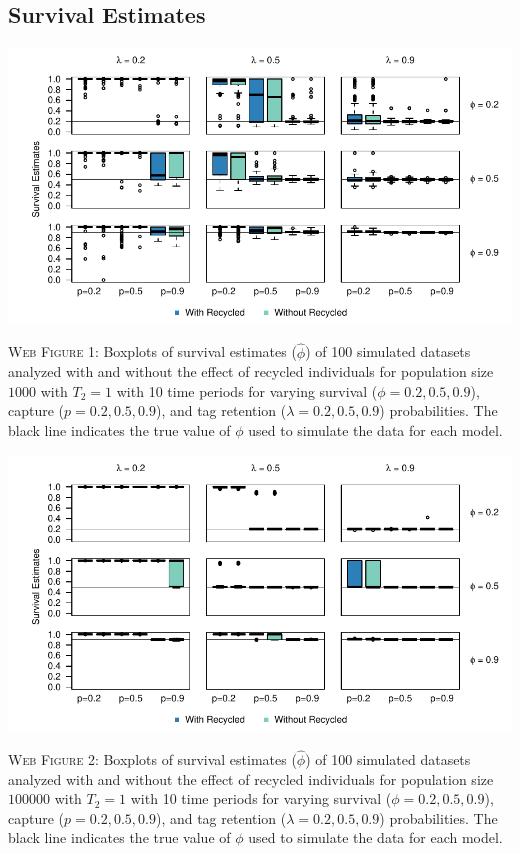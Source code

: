 \documentclass[]{article}
\begin{document}
\clearpage

\subsection{Survival Estimates}\label{survival-estimates}

\includegraphics{Appendix_files/figure-latex/1_survival_GJSTL1-1.pdf}

\textsc{Web Figure 1:} Boxplots of survival estimates (\(\hat{\phi}\))
of 100 simulated datasets analyzed with and without the effect of
recycled individuals for population size \(1000\) with \(T_2=1\) with 10
time periods for varying survival (\(\phi=0.2,0.5,0.9\)), capture
(\(p=0.2,0.5,0.9\)), and tag retention (\(\lambda=0.2,0.5,0.9\))
probabilities. The black line indicates the true value of \(\phi\) used
to simulate the data for each model.

\includegraphics{Appendix_files/figure-latex/2_survival_GJSTL2-1.pdf}

\textsc{Web Figure 2:} Boxplots of survival estimates (\(\hat{\phi}\))
of 100 simulated datasets analyzed with and without the effect of
recycled individuals for population size \(100000\) with \(T_2=1\) with
10 time periods for varying survival (\(\phi=0.2,0.5,0.9\)), capture
(\(p=0.2,0.5,0.9\)), and tag retention (\(\lambda=0.2,0.5,0.9\))
probabilities. The black line indicates the true value of \(\phi\) used
to simulate the data for each model.
\end{document}
